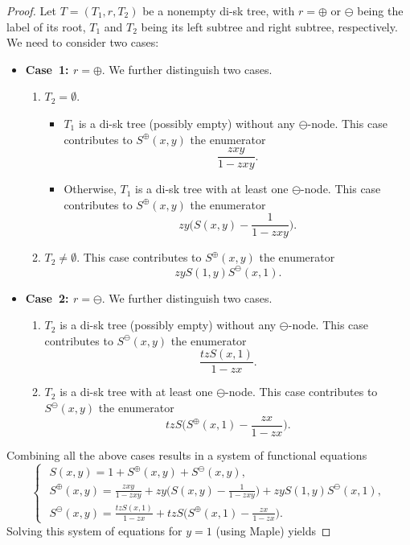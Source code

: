 \documentclass[12pt]{amsart}
\numberwithin{equation}{section}
\theoremstyle{plain}
\theoremstyle{definition}
\begin{document}
\begin{proof}
Let $T=(T_1,r,T_2)$ be a nonempty di-sk tree, with $r=\oplus$ or $\ominus$ being the label of its root, $T_1$ and $T_2$ being its left subtree and right subtree, respectively. We need to consider two cases:
\begin{itemize}
\item {\bf Case~1: $r=\oplus$}. We further distinguish two cases.
\begin{enumerate}
\item $T_2=\emptyset$. 
\begin{itemize}
\item[a)] $T_1$ is a  di-sk tree (possibly empty) without any $\ominus$-node. This case contributes to $S^{\oplus}(x,y)$ the enumerator 
$$\frac{zxy}{1-zxy}.$$
\item[b)] Otherwise, $T_1$ is a  di-sk tree with at least one $\ominus$-node. This case contributes to $S^{\oplus}(x,y)$ the enumerator 
$$zy\biggl(S(x,y)-\frac{1}{1-zxy}\biggr).$$
\end{itemize}
\item $T_2\neq\emptyset$. This case contributes to $S^{\oplus}(x,y)$ the enumerator
$$zyS(1,y)S^{\ominus}(x,1).$$
\end{enumerate}
\item {\bf Case~2: $r=\ominus$}. We further distinguish two cases.
\begin{enumerate}
\item $T_2$ is a  di-sk tree (possibly empty) without any $\ominus$-node. This case contributes to $S^{\ominus}(x,y)$ the enumerator
$$
\frac{tzS(x,1)}{1-zx}.
$$
\item $T_2$ is a  di-sk tree with at least one $\ominus$-node. This case contributes to $S^{\ominus}(x,y)$ the enumerator 
$$tzS\biggl(S^{\oplus}(x,1)-\frac{zx}{1-zx}\biggr).$$
\end{enumerate}
\end{itemize}
Combining all the above cases results in a system of functional equations
\begin{equation}\label{sys:rpop}
\begin{cases}
\,\, S(x,y)=1+S^{\oplus}(x,y)+S^{\ominus}(x,y),\\
\,\, S^{\oplus}(x,y)=\frac{zxy}{1-zxy}+zy\biggl(S(x,y)-\frac{1}{1-zxy}\biggr)+zyS(1,y)S^{\ominus}(x,1),\\
\,\, S^{\ominus}(x,y)=\frac{tzS(x,1)}{1-zx}+tzS\biggl(S^{\oplus}(x,1)-\frac{zx}{1-zx}\biggr).
\end{cases}
\end{equation}
Solving this system of equations for $y=1$ (using Maple) yields

\end{proof}
\end{document}
